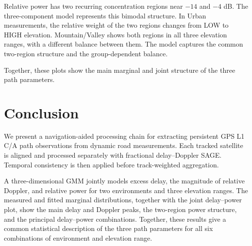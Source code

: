 \documentclass[conference]{IEEEtran}
\begin{document}
Relative power has two recurring concentration regions near $-14$ and $-4$ dB. The three-component model represents this bimodal structure. In Urban measurements, the relative weight of the two regions changes from LOW to HIGH elevation. Mountain/Valley shows both regions in all three elevation ranges, with a different balance between them. The model captures the common two-region structure and the group-dependent balance.

Together, these plots show the main marginal and joint structure of the three path parameters.

\section{Conclusion}
We present a navigation-aided processing chain for extracting persistent GPS L1 C/A path observations from dynamic road measurements. Each tracked satellite is aligned and processed separately with fractional delay--Doppler SAGE. Temporal consistency is then applied before track-weighted aggregation.

A three-dimensional GMM jointly models excess delay, the magnitude of relative Doppler, and relative power for two environments and three elevation ranges. The measured and fitted marginal distributions, together with the joint delay--power plot, show the main delay and Doppler peaks, the two-region power structure, and the principal delay--power combinations. Together, these results give a common statistical description of the three path parameters for all six combinations of environment and elevation range.



\end{document}

